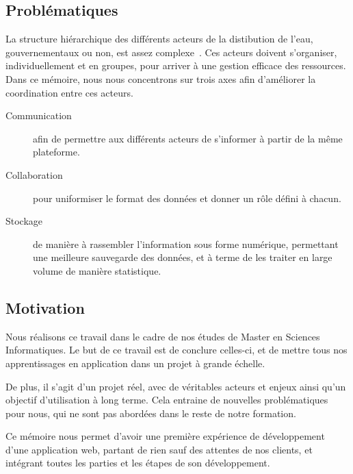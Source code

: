\documentclass{EPL-master-thesis-covers-FR}
\begin{document}
		\subsection*{Problématiques}

			La structure hiérarchique des différents acteurs de la distibution de l'eau, gouvernementaux ou non, est assez complexe~\cite{ref:analyse_contextuelle_commune}. Ces acteurs doivent s'organiser, individuellement et en groupes, pour arriver à une gestion efficace des ressources. Dans ce mémoire, nous nous concentrons sur trois axes afin d'améliorer la coordination entre ces acteurs.

			\begin{description}
				\item[Communication] afin de permettre aux différents acteurs de s'informer à partir de la même plateforme.
				\item[Collaboration] pour uniformiser le format des données et donner un rôle défini à chacun.
				\item[Stockage] de manière à rassembler l'information sous forme numérique, permettant une meilleure sauvegarde des données, et à terme de les traiter en large volume de manière statistique.
			\end{description}

		\subsection*{Motivation}

			Nous réalisons ce travail dans le cadre de nos études de Master en Sciences Informatiques. Le but de ce travail est de conclure celles-ci, et de mettre tous nos apprentissages en application dans un projet à grande échelle.

			De plus, il s'agit d'un projet réel, avec de véritables acteurs et enjeux ainsi qu'un objectif d'utilisation à long terme. Cela entraine de nouvelles problématiques pour nous, qui ne sont pas abordées dans le reste de notre formation.

			Ce mémoire nous permet d'avoir une première expérience de développement d'une application web, partant de rien sauf des attentes de nos clients, et intégrant toutes les parties et les étapes de son développement.
\end{document}
